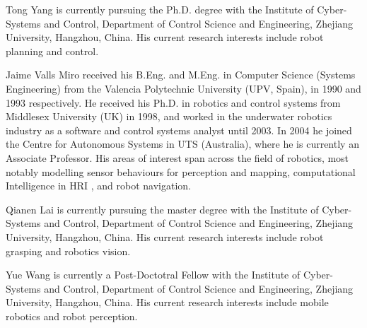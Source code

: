 \documentclass[journal]{IEEEtran}
\begin{document}
\begin{IEEEbiography}{Tong Yang} 
is currently pursuing the Ph.D. degree with the Institute of Cyber-Systems and Control, Department of Control Science and Engineering, Zhejiang University, Hangzhou, China. His current research interests include robot planning and control.
\end{IEEEbiography}

\begin{IEEEbiography}
{Jaime Valls Miro} received his B.Eng. and M.Eng. in Computer Science (Systems Engineering) from the Valencia Polytechnic University (UPV, Spain), in 1990 and 1993 respectively. He received his Ph.D. in robotics and control systems from Middlesex University (UK) in 1998, and worked in the underwater robotics industry as a software and control systems analyst until 2003. In 2004 he joined the Centre for Autonomous Systems in UTS (Australia), where he is currently an Associate Professor. His areas of interest span across the field of robotics, most notably modelling sensor behaviours for perception and mapping, computational Intelligence in HRI , and robot navigation. 
\end{IEEEbiography}


\begin{IEEEbiographynophoto}[]{Qianen Lai}
is currently pursuing the master degree with the Institute of Cyber-Systems and Control, Department of Control Science and Engineering, Zhejiang University, Hangzhou, China. His current research interests include robot grasping and robotics vision.
\end{IEEEbiographynophoto}
\begin{IEEEbiographynophoto}[]{Yue Wang}
 is currently a Post-Doctotral Fellow with the Institute of Cyber-Systems and Control, Department of Control Science and Engineering, Zhejiang University, Hangzhou, China. His current research interests include mobile robotics and robot perception.
\end{IEEEbiographynophoto}
\end{document}
